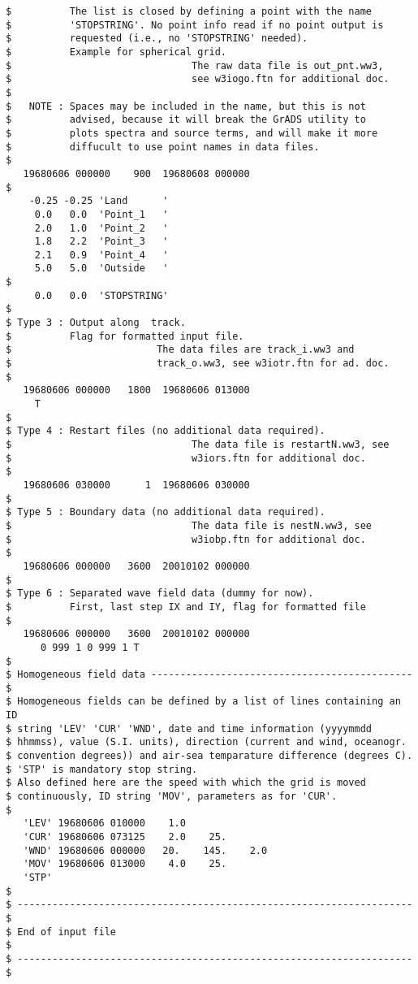 \begin{verbatim}
$          The list is closed by defining a point with the name
$          'STOPSTRING'. No point info read if no point output is
$          requested (i.e., no 'STOPSTRING' needed).
$          Example for spherical grid.
$                               The raw data file is out_pnt.ww3, 
$                               see w3iogo.ftn for additional doc.
$
$   NOTE : Spaces may be included in the name, but this is not
$          advised, because it will break the GrADS utility to 
$          plots spectra and source terms, and will make it more
$          diffucult to use point names in data files.
$
   19680606 000000    900  19680608 000000
$
    -0.25 -0.25 'Land      '
     0.0   0.0  'Point_1   '
     2.0   1.0  'Point_2   '
     1.8   2.2  'Point_3   '
     2.1   0.9  'Point_4   '
     5.0   5.0  'Outside   '
$
     0.0   0.0  'STOPSTRING'
$
$ Type 3 : Output along  track.
$          Flag for formatted input file.
$                         The data files are track_i.ww3 and
$                         track_o.ww3, see w3iotr.ftn for ad. doc.
$
   19680606 000000   1800  19680606 013000
     T
$
$ Type 4 : Restart files (no additional data required).
$                               The data file is restartN.ww3, see
$                               w3iors.ftn for additional doc.
$
   19680606 030000      1  19680606 030000
$
$ Type 5 : Boundary data (no additional data required).
$                               The data file is nestN.ww3, see
$                               w3iobp.ftn for additional doc.
$
   19680606 000000   3600  20010102 000000
$
$ Type 6 : Separated wave field data (dummy for now).
$          First, last step IX and IY, flag for formatted file
$
   19680606 000000   3600  20010102 000000
      0 999 1 0 999 1 T
$
$ Homogeneous field data --------------------------------------------- $
$ Homogeneous fields can be defined by a list of lines containing an ID
$ string 'LEV' 'CUR' 'WND', date and time information (yyyymmdd
$ hhmmss), value (S.I. units), direction (current and wind, oceanogr.
$ convention degrees)) and air-sea temparature difference (degrees C).
$ 'STP' is mandatory stop string.
$ Also defined here are the speed with which the grid is moved
$ continuously, ID string 'MOV', parameters as for 'CUR'.
$
   'LEV' 19680606 010000    1.0
   'CUR' 19680606 073125    2.0    25.
   'WND' 19680606 000000   20.    145.    2.0
   'MOV' 19680606 013000    4.0    25.
   'STP'
$
$ -------------------------------------------------------------------- $
$ End of input file                                                    $
$ -------------------------------------------------------------------- $
\end{verbatim}
